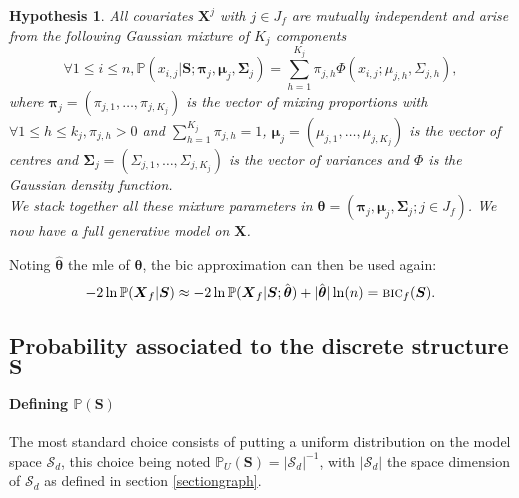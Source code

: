 \documentclass[12pt,a4paper]{report}
\newtheorem{hyp}{Hypothesis}
\begin{document}
\begin{hyp}\label{H4}
All covariates $\boldsymbol{X}^j$ with $j \in J_f$ are mutually independent and arise from the following Gaussian mixture of $K_j$ components
\begin{equation}
\forall 1\leq i \leq n, \mathbb{P}(x_{i,j}|\boldsymbol{S};\boldsymbol{\pi}_{j},\boldsymbol{\mu}_j,\boldsymbol{\Sigma}_j) = \sum_{h=1}^{K_j} \pi_{j,h} \Phi(x_{i,j};\mu_{j,h} ,\Sigma_{j,h}), \nonumber
\end{equation}
where $\boldsymbol{\pi}_{j}=(\pi_{j,1},\ldots,\pi_{j,K_j})$ is the vector of mixing proportions with $\forall 1\leq h\leq k_j , \pi_{j,h}>0$ and $\sum_{h=1}^{K_j}\pi_{j,h}=1$, $\boldsymbol{\mu}_j=(\mu_{j,1},\ldots,\mu_{j,K_j})$  is the vector of centres and $\boldsymbol{\Sigma}_j=(\Sigma_{j,1},\ldots,\Sigma_{j,K_j})$ is the vector of variances and $\Phi$ is the Gaussian density function. \\We stack together all these mixture parameters in $\boldsymbol{\theta}=(\boldsymbol{\pi}_{j},\boldsymbol{\mu}_j,\boldsymbol{\Sigma}_j ; j \in J_f)$. We now have a full generative model on $\boldsymbol{X}$.
\end{hyp}
		 

\vspace{3mm}

Noting $\hat{\boldsymbol{\theta}}$ the {\sc mle} of $\boldsymbol{\theta}$, the {\sc bic} approximation can then be used again:
\begin{equation}
-2\ln \mathbb{P}(\boldsymbol{X}_f|\boldsymbol{S}) \approx -2\ln \mathbb{P}(\boldsymbol{X}_f|\boldsymbol{S};\hat{\boldsymbol{\theta}}) + |\hat{\boldsymbol{\theta}}| \ln(n) = \mbox{{\sc bic}}_f(\boldsymbol{S}). \nonumber
\end{equation}
\subsection{Probability associated to the discrete structure $\boldsymbol{S}$}
\paragraph{Defining $\mathbb{P}(\boldsymbol{S})$} The most standard choice consists of putting a uniform distribution on the model space $\mathcal{S}_d$, this choice being noted $\mathbb{P}_U(\boldsymbol{S}) = |\mathcal{S}_d|^{-1}$, with $|\mathcal{S}_d|$ the space dimension of $\mathcal{S}_d$ as defined in section \ref{sectiongraph}.
		
	
\end{document}
